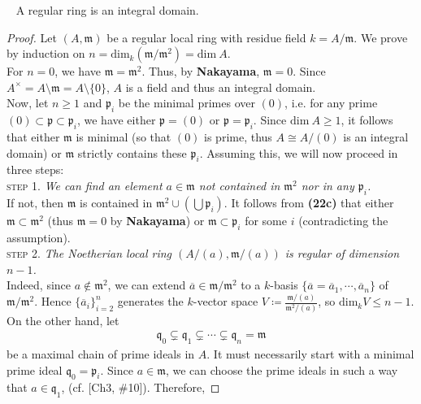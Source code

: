 \documentclass[12pt,a4paper,footinclude=true,headinclude=true]{scrbook} %
\newenvironment{proposition}[2][]
{\renewcommand\theinnercustomprop{#2}\innercustomprop[#1] 
\begin{mdframed}[backgroundcolor=gray!20]\ }
{\end{mdframed}\endinnercustomprop}
\begin{document}
\begin{proposition}{207}
    A regular ring is an integral domain.
\end{proposition}
\begin{proof}
    Let $(A,\mathfrak{m})$ be a regular local ring with residue field $k=A/\mathfrak{m}$. We prove by induction on $n=\mathrm{dim}_k(\mathfrak{m}/\mathfrak{m}^2)=\mathrm{dim}\ A$.\\
    For $n=0$, we have $\mathfrak{m}=\mathfrak{m}^2$. Thus, by \textbf{Nakayama}, $\mathfrak{m}=0$. Since $A^\times=A\setminus\mathfrak{m}=A\setminus\{0\}$, $A$ is a field and thus an integral domain.\\ Now, let $n\geq1$ and $\mathfrak{p}_i$ be the minimal primes over $(0)$, i.e. for any prime $(0)\subset\mathfrak{p}\subset\mathfrak{p}_i$, we have either $\mathfrak{p}=(0)$ or $\mathfrak{p}=\mathfrak{p}_i$. Since $\mathrm{dim}\ A\geq1$, it follows that either $\mathfrak{m}$ is minimal (so that $(0)$ is prime, thus $A\cong A/(0)$ is an integral domain) or $\mathfrak{m}$ strictly contains these $\mathfrak{p}_i$. Assuming this, we will now proceed in three steps:\\
    \textsc{step 1.} \textit{We can find an element $a\in\mathfrak{m}$ not contained in $\mathfrak{m}^2$ nor in any $\mathfrak{p}_i$.}\\
    If not, then $\mathfrak{m}$ is contained in $\mathfrak{m}^2\cup(\bigcup\mathfrak{p}_i)$. It follows from \textbf{(22c)} that either $\mathfrak{m}\subset\mathfrak{m}^2$ (thus $\mathfrak{m}=0$ by \textbf{Nakayama}) or $\mathfrak{m}\subset\mathfrak{p}_i$ for some $i$ (contradicting the assumption).\\
    \textsc{step 2.} \textit{The Noetherian local ring $(A/(a),\mathfrak{m}/(a))$ is regular of dimension $n-1$.}\\
    Indeed, since $a\notin\mathfrak{m}^2$, we can extend $\overline{a}\in\mathfrak{m}/\mathfrak{m}^2$ to a $k$-basis $\{\overline{a}=\overline{a}_1,\cdots,\overline{a}_n\}$ of $\mathfrak{m}/\mathfrak{m}^2$. Hence $\{\overline{a}_i\}_{i=2}^n$ generates the $k$-vector space $V\coloneqq\frac{\mathfrak{m}/(a)}{\mathfrak{m}^2/(a)}$, so $\mathrm{dim}_kV\leq n-1$. On the other hand, let 
    \begin{align*}
        \mathfrak{q}_0\subsetneq\mathfrak{q}_1\subsetneq\cdots\subsetneq\mathfrak{q}_n=\mathfrak{m}
    \end{align*}
    be a maximal chain of prime ideals in $A$. It must necessarily start with a minimal prime ideal $\mathfrak{q}_0=\mathfrak{p}_i$. Since $a\in\mathfrak{m}$, we can choose the prime ideals in such a way that $a\in\mathfrak{q}_1$, (cf. [Ch3, \#10]). Therefore,

\end{proof}
\end{document}
